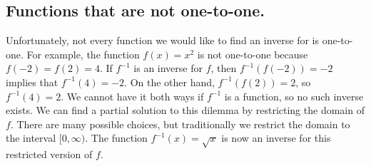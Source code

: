 %


\subsection{Functions that are not one-to-one.}

Unfortunately, not every function we would like to find an inverse for is one-to-one. For example, the function $f(x)=x^2$ is not one-to-one because $f(-2)=f(2)=4$. If $f^{-1}$ is an inverse for $f$, then $f^{-1}(f(-2))=-2$ implies that $f^{-1}(4)=-2$. On the other hand, $f^{-1}(f(2))=2$, so $f^{-1}(4)=2$. We cannot have it both ways if $f^{-1}$ is a function, so no such inverse exists. We can find a partial solution to this dilemma by restricting the domain of $f$. There are many possible choices, but traditionally we restrict the domain to the interval $[0,\infty)$. The function $f^{-1}(x)=\sqrt x$ is now an inverse for this restricted version of $f$.


